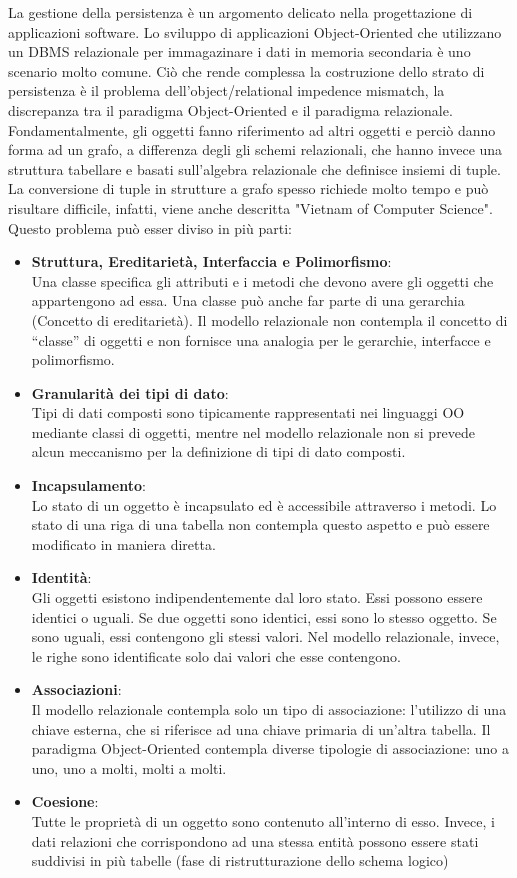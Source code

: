 La gestione della persistenza \`e un argomento delicato nella progettazione di applicazioni software.
Lo sviluppo di applicazioni Object-Oriented che utilizzano un DBMS relazionale per immagazinare i dati in memoria secondaria \`e uno scenario molto comune. Ci\`o che rende complessa la costruzione dello strato di persistenza \`e il problema dell'object/relational impedence mismatch, la discrepanza tra il paradigma Object-Oriented e il paradigma relazionale.
Fondamentalmente, gli oggetti fanno riferimento ad altri oggetti e perci\`o danno forma ad un grafo, a differenza degli gli schemi relazionali, che hanno invece una struttura tabellare e basati sull'algebra relazionale che definisce insiemi di tuple. La conversione di tuple in strutture a grafo spesso richiede molto tempo e pu\`o risultare difficile, infatti, viene anche descritta "Vietnam of Computer Science".
Questo problema pu\`o esser diviso in pi\`u parti:
\begin{itemize}
\item \textbf{Struttura, Ereditariet\`a, Interfaccia e Polimorfismo}:\\
Una classe specifica gli attributi e i metodi che devono avere gli oggetti che appartengono ad essa. Una classe pu\`o anche far parte di una gerarchia (Concetto di ereditariet\`a).
Il modello relazionale non contempla il concetto di “classe” di oggetti e non fornisce una analogia per le gerarchie, interfacce e polimorfismo.  
\item \textbf{Granularit\`a dei tipi di dato}:\\
Tipi di dati composti sono tipicamente  rappresentati nei linguaggi OO mediante classi di oggetti, mentre nel modello relazionale non si prevede alcun meccanismo per la definizione di tipi di dato composti. 
\item \textbf{Incapsulamento}:\\
Lo stato di un oggetto \`e incapsulato ed \`e accessibile attraverso i metodi. Lo stato di una riga di una tabella non contempla questo aspetto e pu\`o essere modificato in maniera diretta.
\item \textbf{Identit\`a}:\\
Gli oggetti esistono indipendentemente dal loro stato. Essi possono essere identici o uguali. Se due oggetti sono identici, essi sono lo stesso oggetto. Se sono uguali, essi contengono gli stessi valori. Nel modello relazionale, invece, le righe sono identificate solo dai valori che esse contengono.
\item \textbf{Associazioni}:\\
Il modello relazionale contempla solo un tipo di associazione: l'utilizzo di una chiave esterna, che si riferisce ad una chiave primaria di un'altra tabella. Il paradigma Object-Oriented contempla diverse tipologie di associazione: uno a uno, uno a molti, molti a molti.
\item \textbf{Coesione}:\\
Tutte le propriet\`a di un oggetto sono contenuto all'interno di esso. Invece, i dati relazioni che corrispondono ad una stessa entit\`a possono essere stati suddivisi in pi\`u tabelle (fase di ristrutturazione dello schema logico)
\end{itemize}
